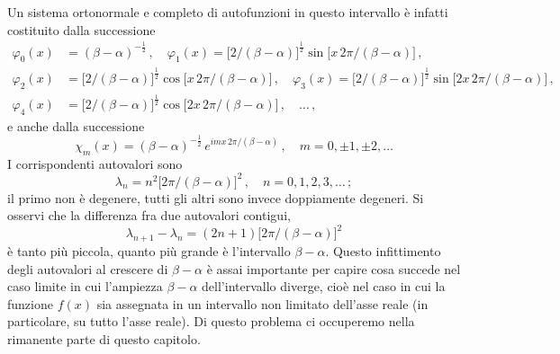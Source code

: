 \documentclass[11pt, a4paper]{book}
\numberwithin{equation}{section}
\begin{document}
Un sistema ortonormale e completo di autofunzioni in questo intervallo è infatti costituito dalla successione
\begin{align*}
  \varphi_0(x) &= (\beta-\alpha)^{-\frac{1}{2}}\,,\quad
  \varphi_1(x) = \bigl[2/(\beta-\alpha)\bigr]^{\frac{1}{2}}\sin\!\bigl[x\,2\pi/(\beta-\alpha)\bigr]\,,\\
  \varphi_2(x) &= \bigl[2/(\beta-\alpha)\bigr]^{\frac{1}{2}}\cos\!\bigl[x\,2\pi/(\beta-\alpha)\bigr]\,,\quad
  \varphi_3(x) = \bigl[2/(\beta-\alpha)\bigr]^{\frac{1}{2}}\sin\!\bigl[2x\,2\pi/(\beta-\alpha)\bigr]\,,\\
  \varphi_4(x) &= \bigl[2/(\beta-\alpha)\bigr]^{\frac{1}{2}}\cos\!\bigl[2x\,2\pi/(\beta-\alpha)\bigr]\,,\quad
  \ldots\,, \tag{9}
\end{align*}
e anche dalla successione
\begin{equation}
  \chi_m(x) = (\beta-\alpha)^{-\frac{1}{2}}\,e^{imx\,2\pi/(\beta-\alpha)}\,,
  \quad m=0,\pm1,\pm2,\ldots \tag{10}
\end{equation}
I corrispondenti autovalori sono
\begin{equation}
  \lambda_n = n^2\bigl[2\pi/(\beta-\alpha)\bigr]^2\,,\quad n=0,1,2,3,\ldots\,; \tag{11}
\end{equation}
il primo non è degenere, tutti gli altri sono invece doppiamente degeneri. Si osservi che la differenza fra due autovalori contigui,
\begin{equation}
  \lambda_{n+1}-\lambda_n = (2n+1)\bigl[2\pi/(\beta-\alpha)\bigr]^2 \tag{12}
\end{equation}
è tanto più piccola, quanto più grande è l'intervallo $\beta-\alpha$. Questo infittimento degli autovalori al crescere di $\beta-\alpha$ è assai importante per capire cosa succede nel caso limite in cui l'ampiezza $\beta-\alpha$ dell'intervallo diverge, cioè nel caso in cui la funzione $f(x)$ sia assegnata in un intervallo non limitato dell'asse reale (in particolare, su tutto l'asse reale). Di questo problema ci occuperemo nella rimanente parte di questo capitolo.
\end{document}
